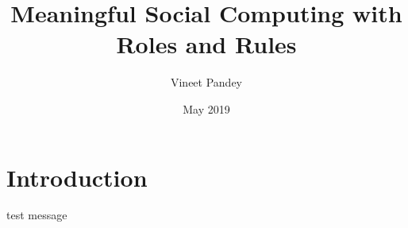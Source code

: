 \documentclass{article}
\title{Meaningful Social Computing with Roles and Rules}
\author{Vineet Pandey}
\date{May 2019}
\begin{document}
\maketitle

\section{Introduction}
test message
\end{document}
